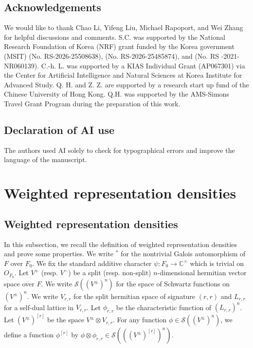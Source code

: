 \documentclass[11pt,oneside]{amsart}
\theoremstyle{plain}
\theoremstyle{definition}
\theoremstyle{remark}
\newcommand{\BC}{{\mathbb C}}
\newcommand{\CS}{{\mathcal S}}
\numberwithin{equation}{section}
\begin{document}
	
	\subsection*{Acknowledgements} We would like to thank Chao Li, Yifeng Liu, Michael Rapoport, and Wei Zhang for helpful discussions and comments. S.C. was supported by the National Research Foundation of Korea (NRF) grant funded by the Korea government (MSIT) (No. RS-2026-25508638), (No. RS-2026-25485874), and (No. RS -2021-NR060139).
    C.-h. L. was supported by a KIAS Individual Grant (AP067301) via the Center for Artificial Intelligence and Natural Sciences at Korea Institute for Advanced Study. Q. H. and  Z. Z. are supported by a research start up fund of the Chinese University of Hong Kong. Q.H. was supported by the AMS-Simons Travel Grant Program during the preparation of this work.
 	
		\subsection*{Declaration of AI use}
	The authors used AI solely to check for typographical errors and improve the language of the manuscript.
    
	\section{Weighted representation densities}\label{sec: weighted rep}
	\subsection{Weighted representation densities}\label{subsection2.1}
	In this subsection, we recall the definition of weighted representation densities and prove some properties. We write $^*$ for the nontrivial Galois automorphism of $F$ over $F_0$. We fix the standard additive character $\psi:F_0 \rightarrow \BC^{\times}$ which is trivial on $O_{F_0}$. Let $V^+$ (resp. $V^{-}$) be a split (resp. non-split) $n$-dimensional hermitian vector space over $F$. We write $\CS((V^{\pm})^{n})$ for the space of Schwartz functions on $(V^{\pm})^{n}$. We write $V_{r,r}$ for the split hermitian space of signature $(r,r)$ and $L_{r,r}$ for a self-dual lattice in $V_{r,r}$. Let $\phi_{r,r}$ be the characteristic function of $(L_{r,r})^{n}$. Let $(V^{\pm})^{[r]}$ be the space $V^{\pm} \otimes V_{r,r}$. For any function $\phi \in \CS((V^{\pm})^{n})$, we define a function $\phi^{[r]}$ by $\phi \otimes \phi_{r,r} \in \CS(((V^{\pm})^{[r]})^{n})$.
	
\end{document}
